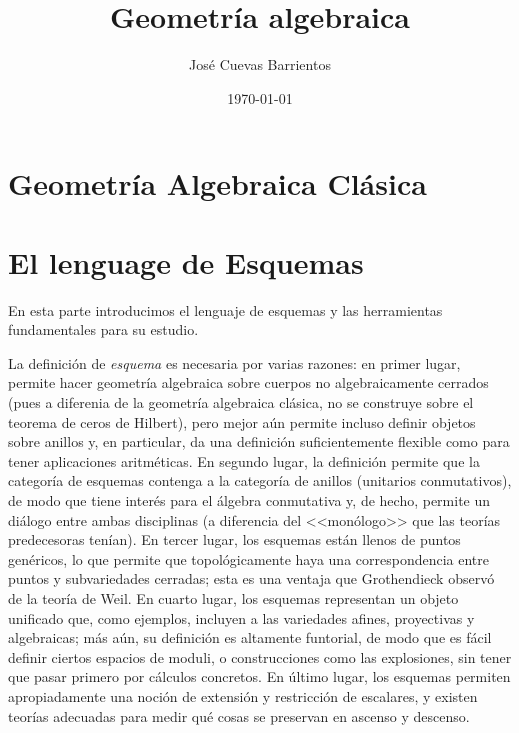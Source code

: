 \documentclass[11pt]{book}
\title{Geometría algebraica}
\author{José Cuevas Barrientos}
\date\today
\begin{document}
\frontmatter
\maketitle
\tableofcontents

% 

\mainmatter
\part{Geometría Algebraica Clásica}




% 

\part{El lenguage de Esquemas}
En esta parte introducimos el lenguaje de esquemas y las herramientas fundamentales para su estudio.

La definición de \textit{esquema} es necesaria por varias razones: en primer lugar, permite hacer geometría algebraica sobre cuerpos no algebraicamente cerrados
(pues a diferenia de la geometría algebraica clásica, no se construye sobre el teorema de ceros de Hilbert), pero mejor aún permite incluso definir objetos
sobre anillos y, en particular, da una definición suficientemente flexible como para tener aplicaciones aritméticas.
En segundo lugar, la definición permite que la categoría de esquemas contenga a la categoría de anillos (unitarios conmutativos), de modo que tiene interés
para el álgebra conmutativa y, de hecho, permite un diálogo entre ambas disciplinas (a diferencia del <<monólogo>> que las teorías predecesoras tenían).
En tercer lugar, los esquemas están llenos de puntos genéricos, lo que permite que topológicamente haya una correspondencia entre puntos y subvariedades cerradas;
esta es una ventaja que Grothendieck observó de la teoría de Weil.
En cuarto lugar, los esquemas representan un objeto unificado que, como ejemplos, incluyen a las variedades afines, proyectivas y algebraicas;
más aún, su definición es altamente funtorial, de modo que es fácil definir ciertos espacios de moduli, o construcciones como las explosiones, sin tener
que pasar primero por cálculos concretos.
En último lugar, los esquemas permiten apropiadamente una noción de extensión y restricción de escalares, y existen teorías adecuadas para medir qué cosas
se preservan en ascenso y descenso.
\end{document}
